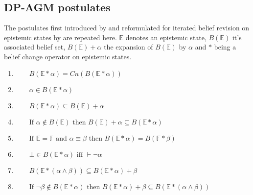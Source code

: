 \documentclass[11pt]{scrartcl}
\theoremstyle{definition}
\theoremstyle{definition}
\begin{document}

\subsection{DP-AGM postulates}
The postulates first introduced by \cite{Alchourron1985} and reformulated for iterated belief revision on epistemic states by \cite{Darwiche1997} are repeated here. $\mathbb{E}$ denotes an epistemic state, $B(\mathbb{E})$ it's associated belief set, $B(\mathbb{E}) + \alpha$ the expansion of $B(\mathbb{E})$ by $\alpha$ and $\ast$ being a belief change operator on epistemic states. 

\begin{enumerate}[wide=0pt, widest=99,leftmargin=\parindent,label = ($\mathbb{E}\!*\!\arabic*$)]
    \item\label{E1} $\qquad B(\mathbb{E}\ast\alpha) = Cn(B(\mathbb{E}\ast\alpha))$
    \item\label{E2} $\qquad \alpha \in B(\mathbb{E}\ast\alpha)$
    \item\label{E3} $\qquad B(\mathbb{E}\ast\alpha)  \subseteq B(\mathbb{E})+\alpha$
    \item\label{E4} $\qquad \textrm{If } \alpha \notin B(\mathbb{E}) \textrm{ then } B(\mathbb{E}) + \alpha \subseteq B(\mathbb{E} \ast \alpha)$
    \item\label{E5} $\qquad \textrm{If } \mathbb{E} = \mathbb{F} \textrm{ and } \alpha \equiv \beta \textrm{ then } B(\mathbb{E} \ast \alpha) = B(\mathbb{F} \ast \beta)$
    \item\label{E6} $\qquad \bot \in B(\mathbb{E} \ast \alpha) \textrm{ iff } \vdash \neg \alpha$
    \item\label{E7} $\qquad B(\mathbb{E} \ast (\alpha \wedge \beta)) \subseteq B(\mathbb{E} \ast \alpha) + \beta$
    \item\label{E8} $\qquad \textrm{If } \neg \beta \notin B(\mathbb{E} \ast \alpha) \textrm{ then } B(\mathbb{E} \ast \alpha) + \beta \subseteq B(\mathbb{E} \ast (\alpha \wedge \beta))$
\end{enumerate}
\end{document}
